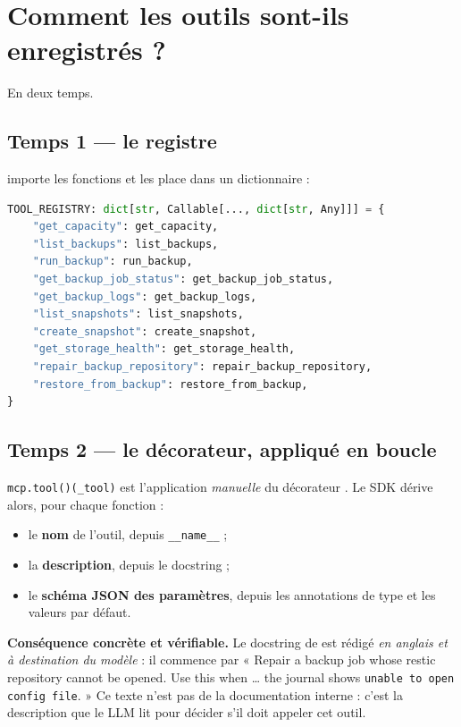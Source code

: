 \section{Comment les outils sont-ils enregistrés ?}

En deux temps.

\subsection*{Temps 1 --- le registre}
 importe les fonctions et les place dans un dictionnaire :

\begin{lstlisting}[language=Python,caption={app/mcp/storage/server.py}]
TOOL_REGISTRY: dict[str, Callable[..., dict[str, Any]]] = {
    "get_capacity": get_capacity,
    "list_backups": list_backups,
    "run_backup": run_backup,
    "get_backup_job_status": get_backup_job_status,
    "get_backup_logs": get_backup_logs,
    "list_snapshots": list_snapshots,
    "create_snapshot": create_snapshot,
    "get_storage_health": get_storage_health,
    "repair_backup_repository": repair_backup_repository,
    "restore_from_backup": restore_from_backup,
}
\end{lstlisting}

\subsection*{Temps 2 --- le décorateur, appliqué en boucle}
\texttt{mcp.tool()(\_tool)} est l'application \emph{manuelle} du décorateur
. Le SDK dérive alors, pour chaque fonction :
\begin{itemize}
  \item le \textbf{nom} de l'outil, depuis \texttt{\_\_name\_\_} ;
  \item la \textbf{description}, depuis le docstring ;
  \item le \textbf{schéma JSON des paramètres}, depuis les annotations de type
  et les valeurs par défaut.
\end{itemize}

\begin{keybox}
\textbf{Conséquence concrète et vérifiable.} Le docstring de
 est rédigé \emph{en anglais et à destination du
modèle} : il commence par « Repair a backup job whose restic repository cannot
be opened. Use this when \ldots{} the journal shows \texttt{unable to open
config file}. » Ce texte n'est pas de la documentation interne : c'est la
description que le LLM lit pour décider s'il doit appeler cet outil.
\end{keybox}

